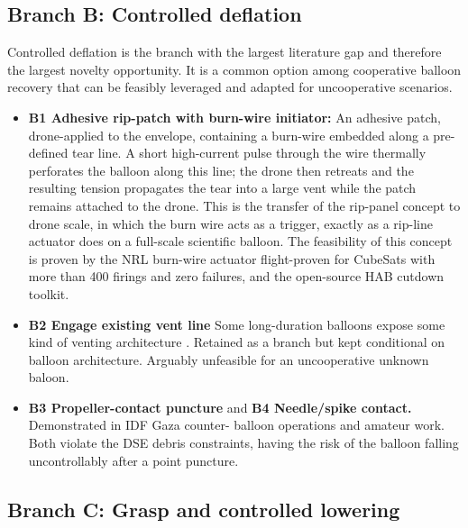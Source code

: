\subsection{Branch B: Controlled deflation}

Controlled deflation is the branch with the largest literature gap and therefore the largest novelty opportunity. It is a common option among cooperative balloon recovery that can be feasibly leveraged and adapted for uncooperative scenarios.

\begin{itemize}[leftmargin=*]
    \item \textbf{B1 Adhesive rip-patch with burn-wire initiator:} An adhesive patch, drone-applied to the envelope, containing a burn-wire embedded along a pre-defined tear line. A short high-current pulse through the wire thermally perforates the balloon along this line; the drone then retreats and the resulting tension propagates the tear into a large vent while the patch remains attached to the drone. This is the transfer of the rip-panel concept \cite{Yajima2009ScientificApplications} to drone scale, in which the burn wire acts as a trigger, exactly as a rip-line actuator does on a full-scale scientific balloon. The feasibility of this concept is proven by the NRL burn-wire actuator\cite{NRL2019} flight-proven for CubeSats with more than 400 firings and zero failures, and the open-source HAB cutdown toolkit\cite{Clark2019AnPayloads}. 

    \item \textbf{B2 Engage existing vent line} Some long-duration balloons expose some kind of venting architecture \cite{Voss2005AltitudeBalloons}. Retained as a branch but kept conditional on balloon architecture. Arguably unfeasible for an uncooperative unknown baloon.

    \item \textbf{B3 Propeller-contact puncture} and \textbf{B4  Needle/spike contact.} Demonstrated in IDF Gaza counter-  balloon operations \cite{Fortem} and amateur work. Both violate the DSE debris constraints, having the risk of the balloon falling uncontrollably after a point puncture. 
\end{itemize}

\subsection{Branch C: Grasp and controlled lowering}

